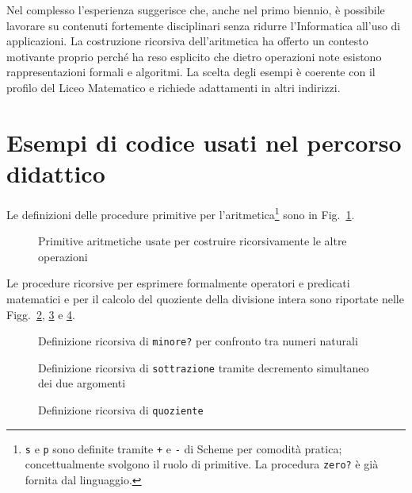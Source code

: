 \documentclass[withtimes]{easychair}
\begin{document}
Nel complesso l'esperienza suggerisce che, anche nel primo biennio, è possibile lavorare su contenuti fortemente disciplinari senza ridurre l'Informatica all'uso di applicazioni. La costruzione ricorsiva dell'aritmetica ha offerto un contesto motivante proprio perché ha reso esplicito che dietro operazioni note esistono rappresentazioni formali e algoritmi. La scelta degli esempi è coerente con il profilo del Liceo Matematico e richiede adattamenti in altri indirizzi.

\appendix

\section{Esempi di codice usati nel percorso didattico}\label{appendice-codice}

Le definizioni delle procedure primitive per l'aritmetica\footnote{\texttt{s} e \texttt{p} sono definite tramite \texttt{+} e \texttt{-} di Scheme per comodità pratica; concettualmente svolgono il ruolo di primitive. La procedura \texttt{zero?} è già fornita dal linguaggio.} sono in Fig.~\ref{fig:primitive-aritmetica}.

\begin{figure}[!htb]
  \centering
  \caption{Primitive aritmetiche usate per costruire ricorsivamente le altre operazioni}\label{fig:primitive-aritmetica}
\end{figure}

Le procedure ricorsive per esprimere formalmente operatori e predicati matematici e per il calcolo del quoziente della divisione intera sono riportate nelle Figg.~\ref{fig:minore?}, \ref{fig:sottrazione} e \ref{fig:appendix-quoziente-scheme}.

\begin{figure}[!htb]
  \centering
  \caption{Definizione ricorsiva di \texttt{minore?} per confronto tra numeri naturali}
  \label{fig:minore?}
\end{figure}

\begin{figure}[!htb]
  \centering
  \caption{Definizione ricorsiva di \texttt{sottrazione} tramite decremento simultaneo dei due argomenti}
  \label{fig:sottrazione}
\end{figure}

\begin{figure}[!htb]
  \centering
  \caption{Definizione ricorsiva di \texttt{quoziente}}
  \label{fig:appendix-quoziente-scheme}
\end{figure}

\label{sect:bib}
\printbibliography
\end{document}
